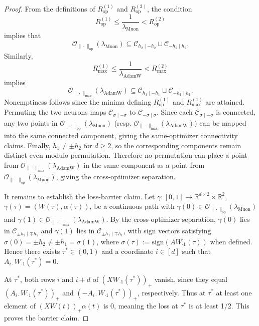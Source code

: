 \documentclass{article}
\newcommand{\op}{\mathrm{op}}
\begin{document}
\begin{proof}
From the definitions of $R_{\op}^{(1)}$ and $R_{\op}^{(2)}$, the condition
\[
R_{\op}^{(1)} \le \frac1{\lambda_{\mathrm{Muon}}} < R_{\op}^{(2)}
\]
implies that
\[
\mathcal{O}_{\|\cdot\|_{\op}}(\lambda_{\mathrm{Muon}})
\subseteq
\mathcal C_{h_2\mid-h_2}\sqcup \mathcal C_{-h_2\mid h_2}.
\]
Similarly,
\[
R_{\max}^{(1)} \le \frac1{\lambda_{\mathrm{AdamW}}} < R_{\max}^{(2)}
\]
implies
\[
\mathcal{O}_{\|\cdot\|_{\max}}(\lambda_{\mathrm{AdamW}})
\subseteq
\mathcal C_{h_1\mid-h_1}\sqcup \mathcal C_{-h_1\mid h_1}.
\]
Nonemptiness follows since the minima defining $R_{\op}^{(1)}$ and $R_{\max}^{(1)}$ are attained.
Permuting the two neurons maps $\mathcal C_{\sigma\mid-\sigma}$ to $\mathcal C_{-\sigma\mid\sigma}$. Since each $\mathcal C_{\sigma\mid-\sigma}$ is connected, any two points in $\mathcal{O}_{\|\cdot\|_{\op}}(\lambda_{\mathrm{Muon}})$ (resp. $\mathcal{O}_{\|\cdot\|_{\max}}(\lambda_{\mathrm{AdamW}})$) can be mapped into the same connected component, giving the same-optimizer connectivity claims.
Finally, $h_1\neq\pm h_2$ for $d\ge 2$, so the corresponding components remain distinct even modulo permutation. Therefore no permutation can place a point from $\mathcal{O}_{\|\cdot\|_{\max}}(\lambda_{\mathrm{AdamW}})$ in the same component as a point from $\mathcal{O}_{\|\cdot\|_{\op}}(\lambda_{\mathrm{Muon}})$, giving the cross-optimizer separation.
 
It remains to establish the loss-barrier claim. Let $\gamma:[0,1]\to \mathbb{R}^{d\times 2}\times \mathbb{R}^2$, $\gamma(\tau) = (W(\tau),\alpha(\tau))$, be a continuous path with $\gamma(0)\in \mathcal{O}_{\|\cdot\|_{\op}}(\lambda_{\mathrm{Muon}})$ and $\gamma(1)\in \mathcal{O}_{\|\cdot\|_{\max}}(\lambda_{\mathrm{AdamW}})$. By the cross-optimizer separation, $\gamma(0)$ lies in $\mathcal{C}_{\pm h_2\mid \mp h_2}$ and $\gamma(1)$ lies in $\mathcal{C}_{\pm h_1\mid \mp h_1}$, with sign vectors satisfying $\sigma(0) = \pm h_2 \neq \pm h_1 = \sigma(1)$, where $\sigma(\tau) := \mathrm{sign}(AW_{\cdot 1}(\tau))$ when defined. Hence there exists $\tau^*\in(0,1)$ and a coordinate $i\in[d]$ such that $A_{i\cdot}W_{\cdot 1}(\tau^*) = 0$.
 
At $\tau^*$, both rows $i$ and $i+d$ of $(XW_{\cdot 1}(\tau^*))_+$ vanish, since they equal $(A_{i\cdot}W_{\cdot 1}(\tau^*))_+$ and $(-A_{i\cdot}W_{\cdot 1}(\tau^*))_+$, respectively. Thus at $\tau^{*}$ at least one element of $(XW(t))_{+}\alpha(t)$ is 0, meaning the loss at $\tau^{*}$ is at least 1/2. This proves the barrier claim.
\end{proof}
\end{document}
